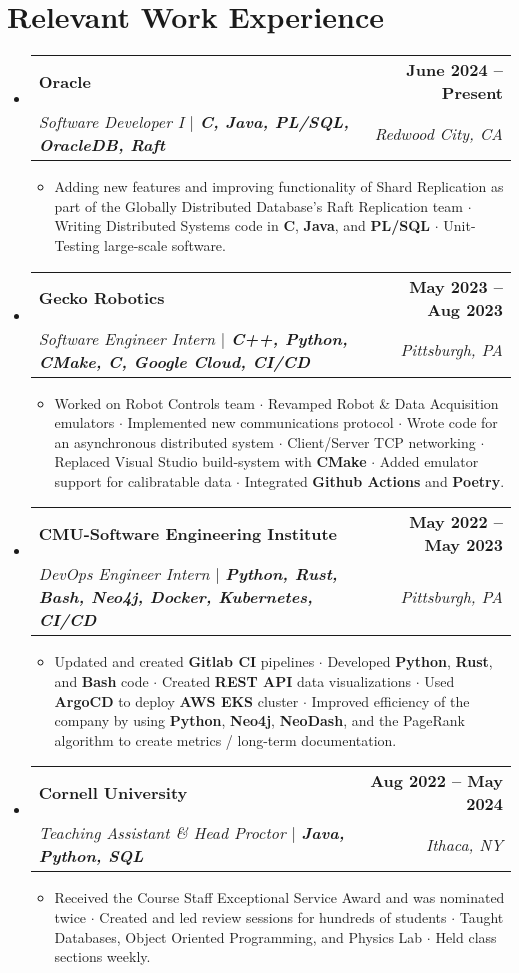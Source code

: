 \documentclass[letterpaper,11pt]{article}
\makeatletter
\newcommand{\resumeItem}[1]{
  \item\small{
    {#1 \vspace{-2pt}}
  }
}
\newcommand{\resumeSubheading}[4]{
  \vspace{-2pt}\item
    \begin{tabular*}{1.0\textwidth}[t]{l@{\extracolsep{\fill}}r}
      \textbf{#1} & \textbf{\small #2} \\
      \textit{\small#3} & \textit{\small #4} \\
    \end{tabular*}\vspace{-7pt}
}
\newcommand{\resumeSubHeadingListStart}{\begin{itemize}[leftmargin=0.0in, label={}]}
\newcommand{\resumeSubHeadingListEnd}{\end{itemize}}
\newcommand{\resumeItemListStart}{\begin{itemize}}
\newcommand{\resumeItemListEnd}{\end{itemize}\vspace{-5pt}}
\makeatother
\begin{document}
\section{\textcolor{customred}{Relevant Work Experience}}
  \resumeSubHeadingListStart
    \resumeSubheading
      {Oracle}{June 2024 -- Present}
      {Software Developer I $|$ \textbf{\emph{C, Java, PL/SQL, OracleDB, Raft}}}{Redwood City, CA}
      \resumeItemListStart
      \resumeItem {Adding new features and improving functionality of Shard Replication as part of the Globally Distributed Database's Raft Replication team $\cdot$ 
      Writing Distributed Systems code in \textbf{C}, \textbf{Java}, and \textbf{PL/SQL} $\cdot$ Unit-Testing large-scale software.}
      \resumeItemListEnd

    \resumeSubheading
      {Gecko Robotics}
      {May 2023 -- Aug 2023}
      {Software Engineer Intern $|$ \textbf{\emph{C++, Python, CMake, C, Google Cloud, CI/CD}}}{Pittsburgh, PA}
      \resumeItemListStart
      \resumeItem {Worked on Robot Controls team $\cdot$ Revamped Robot \& Data Acquisition emulators $\cdot$ 
        Implemented new communications protocol $\cdot$ Wrote code for an asynchronous distributed system $\cdot$ 
        Client/Server TCP networking $\cdot$ Replaced Visual Studio build-system with \textbf{CMake} $\cdot$ Added emulator support
        for calibratable data $\cdot$ Integrated \textbf{Github Actions} and \textbf{Poetry}.}
      \resumeItemListEnd
    
    \resumeSubheading
      {CMU-Software Engineering Institute }{May 2022 -- May 2023}
      {DevOps Engineer Intern  $|$ \textbf{\emph{Python, Rust, Bash, Neo4j, Docker, Kubernetes, CI/CD}}}{Pittsburgh, PA}
      \resumeItemListStart
      \resumeItem {Updated and created \textbf{Gitlab CI} pipelines $\cdot$ Developed \textbf{Python}, \textbf{Rust},
        and \textbf{Bash} code $\cdot$ Created
        \textbf{REST API} data visualizations $\cdot$ Used \textbf{ArgoCD} to deploy \textbf{AWS EKS} cluster $\cdot$ Improved               
        efficiency of the company by using \textbf{Python}, \textbf{Neo4j}, \textbf{NeoDash}, and the PageRank algorithm to 
        create metrics / long-term documentation.}
      \resumeItemListEnd

      \resumeSubheading
      {Cornell University}{Aug 2022 -- May 2024}
      {Teaching Assistant \& Head Proctor $|$ \textbf{\emph{Java, Python, SQL}}}{Ithaca, NY}
      \resumeItemListStart
        \resumeItem {Received the Course Staff Exceptional Service Award and was nominated twice $\cdot$ Created and led review sessions for hundreds of students $\cdot$ Taught Databases, Object Oriented Programming, and Physics Lab
        $\cdot$ Held class sections weekly.
        }
      \resumeItemListEnd
  \resumeSubHeadingListEnd
\vspace{-18pt}
\end{document}
